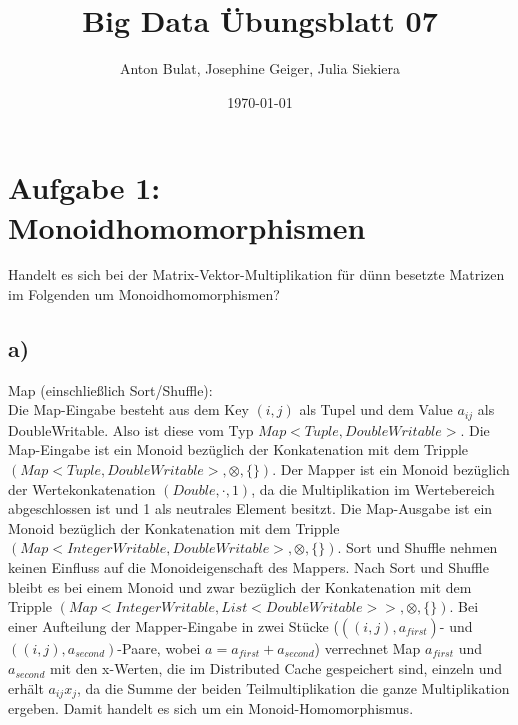 \documentclass{article}
\title{Big Data \"Ubungsblatt 07}
\author{Anton Bulat, Josephine Geiger, Julia Siekiera} %
\date{\today} %
\begin{document}
\maketitle %

\section*{Aufgabe 1: Monoidhomomorphismen}
Handelt es sich bei der Matrix-Vektor-Multiplikation f\"ur d\"unn besetzte Matrizen im Folgenden um Monoidhomomorphismen?\\

\subsection*{a)}
Map (einschließlich Sort/Shuffle):\\
Die Map-Eingabe besteht aus dem Key $(i,j)$ als Tupel und dem Value $a_{ij}$ als DoubleWritable. Also ist diese vom Typ $Map<Tuple, DoubleWritable>$. Die Map-Eingabe ist ein Monoid bez\"uglich der Konkatenation mit dem Tripple $(Map<Tuple, DoubleWritable>,\otimes,\{\})$. Der Mapper ist ein Monoid bez\"uglich der Wertekonkatenation $(Double, \cdot, 1)$, da die Multiplikation im Wertebereich abgeschlossen ist und 1 als neutrales Element besitzt. Die Map-Ausgabe ist ein Monoid bez\"uglich der Konkatenation mit dem Tripple $(Map<IntegerWritable, DoubleWritable>,\otimes,\{\})$. Sort und Shuffle nehmen keinen Einfluss auf die Monoideigenschaft des Mappers. Nach Sort und Shuffle bleibt es bei einem Monoid und zwar bez\"uglich der Konkatenation mit dem Tripple $(Map<IntegerWritable, List<DoubleWritable>>,\otimes,\{\})$. Bei einer Aufteilung der Mapper-Eingabe in zwei St\"ucke ($((i,j), a_{\textit{first}})$- und $((i,j),a_{\textit{second}})$-Paare, wobei $a=a_{\textit{first}}+a_{\textit{second}}$) verrechnet Map $a_{\textit{first}}$ und $a_{\textit{second}}$ mit den x-Werten, die im Distributed Cache gespeichert sind, einzeln und erh\"alt $a_{ij}x_{j}$, da die Summe der beiden Teilmultiplikation die ganze Multiplikation ergeben. Damit handelt es sich um ein Monoid-Homomorphismus.\\
\end{document}
